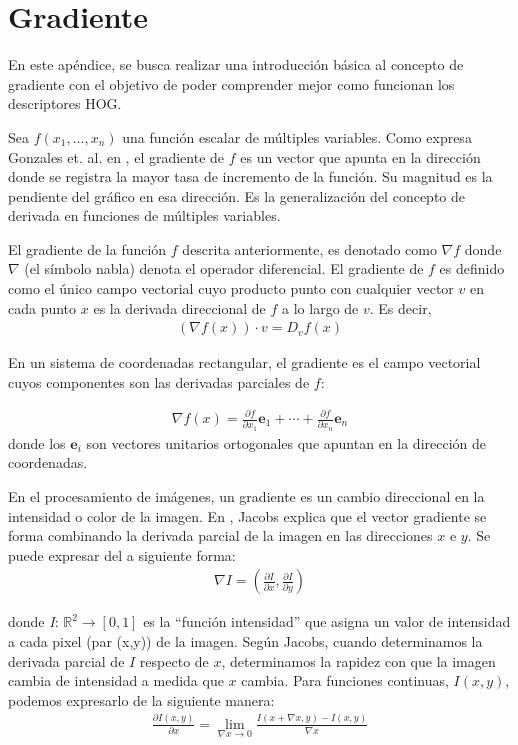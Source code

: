 \section{Gradiente}
\label{section:Apendice-C}

En este apéndice, se busca realizar una introducción básica al concepto de gradiente con el objetivo de poder comprender mejor como funcionan los descriptores HOG.

Sea $f(x_1,\dots,x_n)$ una función escalar de múltiples variables. Como expresa Gonzales et. al. en \cite{GonWoods}, el gradiente de $f$ es un vector que apunta en la dirección donde se registra la mayor tasa de incremento de la función. Su magnitud es la pendiente del gráfico en esa dirección. Es la generalización del concepto de derivada en funciones de múltiples variables.
		
	El gradiente de la función $f$ descrita anteriormente, es denotado como $\nabla f$ donde $\nabla$ (el símbolo nabla) denota el operador diferencial. El gradiente de $f$ es definido como el único campo vectorial cuyo producto punto con cualquier vector $v$ en cada punto $x$ es la derivada direccional de $f$ a lo largo de $v$. Es decir,
		 \begin{align*}
		 	(\nabla f(x))\cdot v = D_v f(x)
		 \end{align*}
		 
	En un sistema de coordenadas rectangular, el gradiente es el campo vectorial cuyos componentes son las derivadas parciales de $f$:
		 
		 \begin{align*}
		 	\nabla f(x) = \frac{\partial f}{\partial x_1}\mathbf{e}_1 + \cdots + \frac{\partial f}{\partial x_n }\mathbf{e}_n
		 \end{align*}
	donde los $\mathbf{e}_i$ son vectores unitarios ortogonales que apuntan en la dirección de coordenadas.

	En el procesamiento de imágenes, un gradiente es un cambio direccional en la intensidad o color de la imagen. En \cite{DJacobs}, Jacobs explica que el vector gradiente se forma combinando la derivada parcial de la imagen en las direcciones $x$ e $y$. Se puede expresar del a siguiente forma:
		\begin{align}
			\nabla I = \left( \frac{\partial I}{\partial x} , \frac{\partial I}{\partial y} \right)
		\end{align}	
		
	donde \textit{I}: $\mathbb{R}^{2} \rightarrow [0, 1]$ es la ``función intensidad'' que asigna un valor de intensidad a cada pixel (par (x,y)) de la imagen. Según Jacobs, cuando determinamos la derivada parcial de $I$ respecto de $x$, determinamos la rapidez con que la imagen cambia de intensidad a medida que $x$ cambia. Para funciones continuas, $I(x,y)$, podemos expresarlo de la siguiente manera:
	\begin{align}
		\frac{\partial I(x,y)}{\partial x} = \lim_{\nabla x\rightarrow 0} \frac{I(x + \nabla x, y) - I(x,y)}{\nabla x}	
	\end{align}
	
